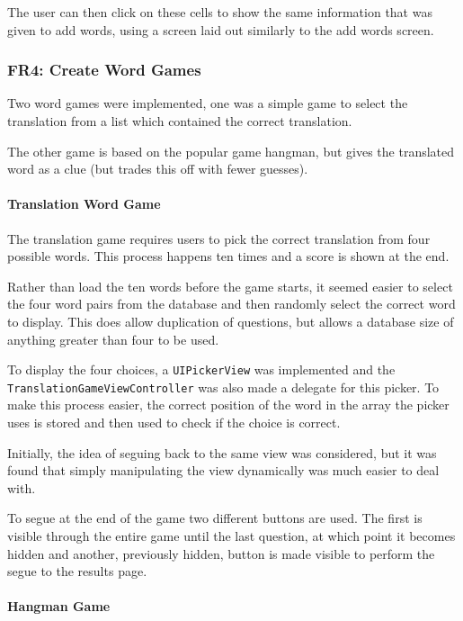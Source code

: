 \documentclass[11pt, a4paper]{article}
\begin{document}
The user can then click on these cells to show the same information that was given to add words, using a screen laid out similarly to the add words screen.

\subsubsection{FR4: Create Word Games}

Two word games were implemented, one was a simple game to select the translation from a list which contained the correct translation.

The other game is based on the popular game hangman, but gives the translated word as a clue (but trades this off with fewer guesses).

\paragraph{Translation Word Game}\hfill

The translation game requires users to pick the correct translation from four possible words. This process happens ten times and a score is shown at the end.

Rather than load the ten words before the game starts, it seemed easier to select the four word pairs from the database and then randomly select the correct word to display. This does allow duplication of questions, but allows a database size of anything greater than four to be used.

To display the four choices, a \texttt{UIPickerView} was implemented and the \texttt{TranslationGameViewController} was also made a delegate for this picker. To make this process easier, the correct position of the word in the array the picker uses is stored and then used to check if the choice is correct.

Initially, the idea of seguing back to the same view was considered, but it was found that simply manipulating the view dynamically was much easier to deal with.

To segue at the end of the game two different buttons are used. The first is visible through the entire game until the last question, at which point it becomes hidden and another, previously hidden, button is made visible to perform the segue to the results page.

\paragraph{Hangman Game}\hfill
\end{document}
